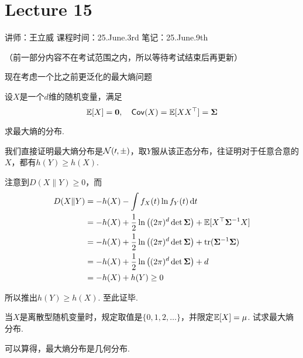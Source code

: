 \chapter{Lecture 15}

\begin{center}
    讲师：王立威 \qquad
    课程时间：25.June.3rd \qquad 
    笔记：25.June.9th
\end{center}

\bigskip

（前一部分内容不在考试范围之内，所以等待考试结束后再更新）

现在考虑一个比之前更泛化的最大熵问题 
\begin{example}
    设$X$是一个$d$维的随机变量，满足 
    \[
        \E[X] = \boldsymbol{0}, \quad \cov(X) = \E[XX^\top] = \boldsymbol{\Sigma}
    \]

求最大熵的分布.
\end{example}
\begin{solution}
    我们直接证明最大熵分布是$\cal{N}(\boldsymbol{0}, \boldsymbol{\Sigma})$，取$Y$服从该正态分布，往证明对于任意合意的$X$，都有$h(Y) \ge h(X)$. 

    注意到$D(X\| Y) \ge 0$，而 
    \begin{align*}
        D(X\| Y) & = -h(X) - \int f_X(t) \ln f_Y(t)\dx[t] \\
       & = -h(X) + \frac{1}{2} \ln \left( (2\pi)^d \det \boldsymbol{\Sigma} \right) + \E[X^{\top} \boldsymbol{\Sigma}^{-1} X] \\
        & = -h(X) + \frac{1}{2} \ln \left( (2\pi)^d \det \boldsymbol{\Sigma} \right) + \text{tr}(\boldsymbol{\Sigma}^{-1} \boldsymbol{\Sigma} ) \\
        & = -h(X) + \frac{1}{2} \ln \left( (2\pi)^d \det \boldsymbol{\Sigma} \right) + d \\
        & = -h(X) + h(Y) \ge 0
    \end{align*}

    所以推出$h(Y) \ge h(X)$. 至此证毕.
\end{solution}

\begin{example}
    当$X$是离散型随机变量时，规定取值是$\{0,1,2,\dots\}$，并限定$\E[X] = \mu$. 试求最大熵分布. 
\end{example}
\begin{solution}
    可以算得，最大熵分布是几何分布. 
\end{solution}

